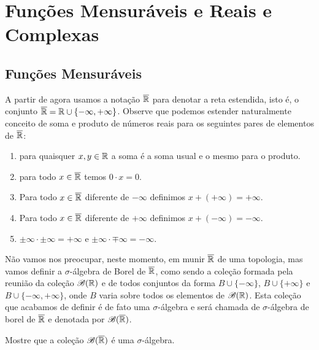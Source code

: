 \chapter[Aula 5]{Funções Mensuráveis e Reais e Complexas}
\chaptermark{}

\section{Funções Mensuráveis}

A partir de agora usamos a notação $\overline{\mathbb{R}}$ 
para denotar a reta estendida, isto é, o conjunto
$\overline{\mathbb{R}} = \mathbb{R}\cup\{-\infty,+\infty\}$. 
Observe que podemos estender naturalmente conceito 
de soma e produto  de números reais
para os seguintes pares de elementos 
de $\overline{\mathbb{R}}$:
\begin{enumerate}
	\item 
	para quaisquer $x,y\in \mathbb{R}$ a soma é a soma usual 
	e o mesmo para o produto. 
	
	\item para todo $x\in \overline{\mathbb{R}}$ temos 
	$0\cdot x=0$.
	
	\item Para todo $x\in \overline{\mathbb{R}}$ diferente de 
	$-\infty$ definimos $x+(+\infty)=+\infty$.

	\item Para todo $x\in \overline{\mathbb{R}}$ diferente de 
	$+\infty$ definimos $x+(-\infty)=-\infty$.
	
	\item 
	$\pm \infty \cdot \pm \infty = +\infty$ 
	e
	$\pm \infty \cdot \mp \infty = -\infty$.
	
\end{enumerate}

Não vamos nos preocupar, neste momento, em munir $\overline{\mathbb{R}}$ 
de uma topologia, mas vamos definir a $\sigma$-álgebra
de Borel de $\overline{\mathbb{R}}$,
como sendo a coleção formada pela reunião da
coleção $\mathscr{B}(\mathbb{R})$ 
e de todos conjuntos da forma 
$B\cup\{-\infty\}$, $B\cup\{+\infty\}$ e $B\cup\{-\infty,+\infty\}$,
onde $B$ varia sobre todos os elementos de $\mathscr{B}(\mathbb{R})$.
Esta coleção que acabamos de definir
é de fato uma $\sigma$-álgebra e será chamada de $\sigma$-álgebra
de borel de $\overline{\mathbb{R}}$ e denotada por $\mathscr{B}(\overline{\mathbb{R}})$.

\begin{exercicio}
	Mostre que a coleção $\mathscr{B}(\overline{\mathbb{R}})$ 
	é uma $\sigma$-álgebra.
\end{exercicio}

